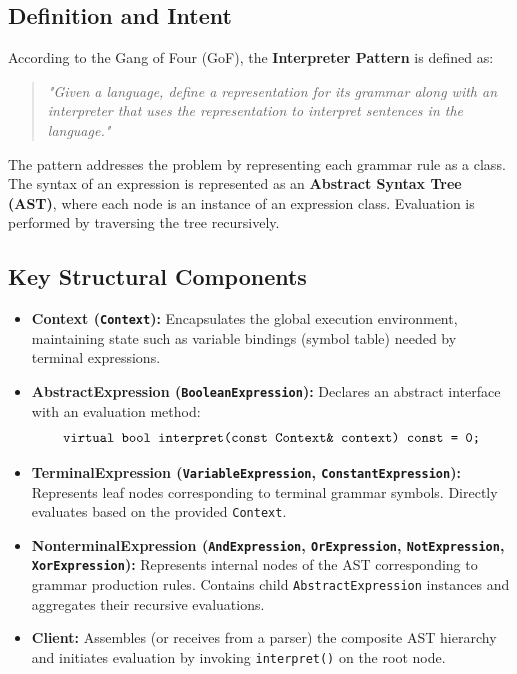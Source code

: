 \documentclass[12pt,a4paper]{article}
\begin{document}
\subsection{Definition and Intent}
According to the Gang of Four (GoF), the \textbf{Interpreter Pattern} is defined as:
\begin{quote}
\textit{"Given a language, define a representation for its grammar along with an interpreter that uses the representation to interpret sentences in the language."}
\end{quote}

The pattern addresses the problem by representing each grammar rule as a class. The syntax of an expression is represented as an \textbf{Abstract Syntax Tree (AST)}, where each node is an instance of an expression class. Evaluation is performed by traversing the tree recursively.

\subsection{Key Structural Components}
\begin{itemize}
    \item \textbf{Context (\texttt{Context}):} Encapsulates the global execution environment, maintaining state such as variable bindings (symbol table) needed by terminal expressions.
    \item \textbf{AbstractExpression (\texttt{BooleanExpression}):} Declares an abstract interface with an evaluation method:
    \begin{equation*}
        \text{\texttt{virtual bool interpret(const Context\& context) const = 0;}}
    \end{equation*}
    \item \textbf{TerminalExpression (\texttt{VariableExpression}, \texttt{ConstantExpression}):} Represents leaf nodes corresponding to terminal grammar symbols. Directly evaluates based on the provided \texttt{Context}.
    \item \textbf{NonterminalExpression (\texttt{AndExpression}, \texttt{OrExpression}, \texttt{NotExpression}, \texttt{XorExpression}):} Represents internal nodes of the AST corresponding to grammar production rules. Contains child \texttt{AbstractExpression} instances and aggregates their recursive evaluations.
    \item \textbf{Client:} Assembles (or receives from a parser) the composite AST hierarchy and initiates evaluation by invoking \texttt{interpret()} on the root node.
\end{itemize}
\end{document}
